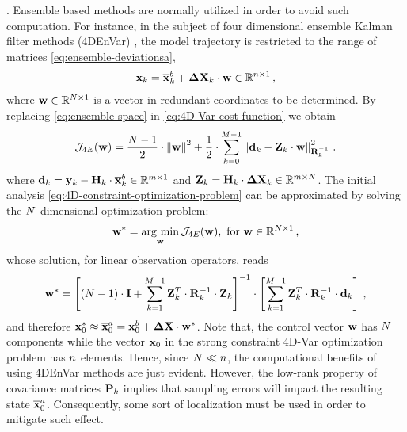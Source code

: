 . Ensemble based methods are normally utilized in order to avoid such computation. For instance, in the subject of four dimensional ensemble Kalman filter methods (4DEnVar) \cite{desroziers20144denvar,fairbairn2014comparison,tian2008ensemble}, the model trajectory is restricted to the range of matrices \eqref{eq:ensemble-deviationsa},
\begin{eqnarray}
\label{eq:ensemble-space}
\x_k = \xm^b_k + \DX_k \cdot \wv \in \Re^{\Nstate \times 1} \,,
\end{eqnarray}
%
where $\wv \in \Re^{\Nens \times 1}$ is a vector in redundant coordinates to be determined. By replacing \eqref{eq:ensemble-space} in \eqref{eq:4D-Var-cost-function} we obtain
\begin{eqnarray}
\displaystyle
\J_{4E}(\wv) = \frac{\Nens-1}{2} \cdot \norm{\wv}^2 + \frac{1}{2} \cdot \sum_{k=0}^{\N-1} \norm{\dv_k-\Z_k \cdot \wv}^2_{\R_k^{-1}} \,.
\end{eqnarray}
%
where $\dv_k = \y_k - \H_k \cdot \xm^b_k \in \Re^{\Nobs \times 1}$ and $\Z_k = \H_k \cdot \DX_k \in \Re^{\Nobs \times \Nens}$. The initial analysis \eqref{eq:4D-constraint-optimization-problem} can be approximated by solving the $\Nens$-dimensional optimization problem:
\begin{eqnarray}
\label{eq:reduced-space-optimization-problem}
\displaystyle
\wv^{*} = \underset{\wv}{\arg\,\min} \, \J_{4E}(\wv), \text{ for $\wv \in \Re^{\Nens \times 1}$} \,,
\end{eqnarray}
%
whose solution, for linear observation operators, reads
%
\begin{eqnarray*}
\displaystyle
\wv^{*} = \leftb (\Nens-1) \cdot \I + \sum_{k=1}^{\N-1} \Z_k^T \cdot \R_k^{-1} \cdot \Z_k \rightb^{-1} \cdot \leftb \sum_{k=1}^{\N-1} \Z_k^T \cdot \R_k^{-1} \cdot \dv_k \rightb \,,
\end{eqnarray*}
and therefore $\x_0^{*} \approx \xm_0^a = \x_0^b + \DX \cdot \w^{*}$. Note that, the control vector $\w$ has $\Nens$ components while the vector $\x_0$ in the strong constraint 4D-Var optimization problem has $\Nstate$ elements. Hence, since $\Nens \ll \Nstate$, the computational benefits of using 4DEnVar methods are just evident. However, the low-rank property of covariance matrices $\P_k$ implies that sampling errors will impact the resulting state $\xm^a_0$. Consequently, some sort of localization must be used in order to mitigate such effect. 

